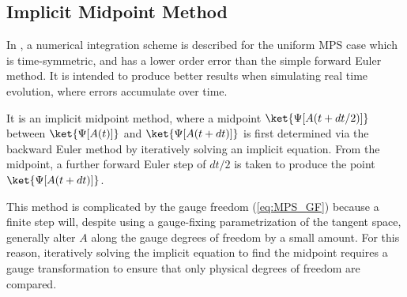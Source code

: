 \documentclass[a4paper,11pt]{article}
\begin{document}
\subsection{Implicit Midpoint Method}
In \cite{haegeman_time-dependent_2011}, a numerical integration scheme is described
for the uniform MPS case which
is time-symmetric, and has a lower order error than the simple forward Euler method.
It is intended to produce better results when simulating real time evolution, where
errors accumulate over time.

It is an implicit midpoint method, where a midpoint $\ket{\Psi[A(t + dt/2)]}$ between 
$\ket{\Psi[A(t)]}$ and $\ket{\Psi[A(t + dt)]}$
is first determined via the backward Euler method by iteratively solving an implicit
equation. From the midpoint,
a further forward Euler step of $dt/2$ is taken to produce the point $\ket{\Psi[A(t + dt)]}$.

This method is complicated by the gauge freedom (\ref{eq:MPS_GF}) because a finite step
will, despite using a gauge-fixing parametrization of the tangent space, generally alter
$A$ along the gauge degrees of freedom by a small amount. For this reason, iteratively solving
the implicit equation to find the midpoint requires a
gauge transformation to ensure that only physical degrees of freedom are compared.
\end{document}

